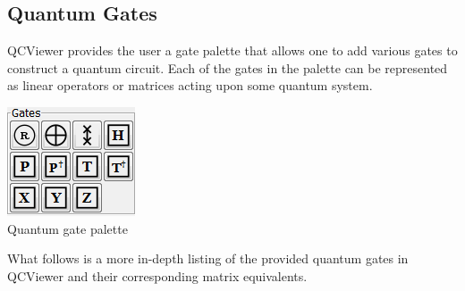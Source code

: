 \documentclass[10pt]{article}
\theoremstyle{definition}
\begin{document}
\subsection{Quantum Gates} \label{sub:QuantumGates}

QCViewer provides the user a gate palette that allows one to add various gates to construct a quantum circuit. Each of the gates in the palette can be represented as linear operators or matrices acting upon some quantum system. 

\begin{center}
\includegraphics{Figures/Gates/Gates.png}\\
Quantum gate palette
\end{center}

What follows is a more in-depth listing of the provided quantum gates in QCViewer and their corresponding matrix equivalents. 
\end{document}
